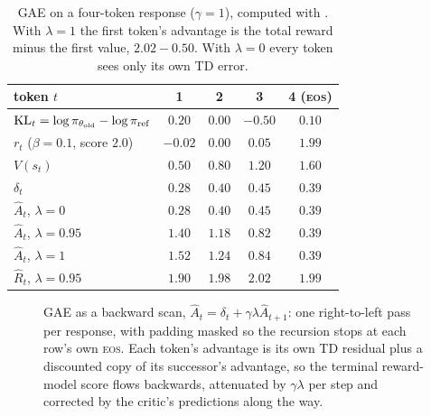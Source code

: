 \begin{table}[ht]
\centering\small
\begin{tabular}{@{}lcccc@{}}
\toprule
token $t$ & 1 & 2 & 3 & 4 (\textsc{eos})\\
\midrule
$\mathrm{KL}_t=\log\pi_{\theta_{\text{old}}}-\log\pi_{\text{ref}}$ & $0.20$ & $0.00$ & $-0.50$ & $0.10$\\
$r_t$ ($\beta=0.1$, score $2.0$) & $-0.02$ & $0.00$ & $0.05$ & $1.99$\\
$V(s_t)$ & $0.50$ & $0.80$ & $1.20$ & $1.60$\\
$\delta_t$ & $0.28$ & $0.40$ & $0.45$ & $0.39$\\
\midrule
$\hat A_t$, $\lambda=0$ & $0.28$ & $0.40$ & $0.45$ & $0.39$\\
$\hat A_t$, $\lambda=0.95$ & $1.40$ & $1.18$ & $0.82$ & $0.39$\\
$\hat A_t$, $\lambda=1$ & $1.52$ & $1.24$ & $0.84$ & $0.39$\\
$\hat R_t$, $\lambda=0.95$ & $1.90$ & $1.98$ & $2.02$ & $1.99$\\
\bottomrule
\end{tabular}
\caption{GAE on a four-token response ($\gamma=1$), computed with . With $\lambda=1$ the
first token's advantage is the total reward minus the first value, $2.02-0.50$. With $\lambda=0$
every token sees only its own TD error.}
\label{tab:rlhf:gae}
\end{table}

\begin{figure}[ht]
\centering
{}
\caption{GAE as a backward scan, $\hat A_t=\delta_t+\gamma\lambda\hat A_{t+1}$: one right-to-left
pass per response, with padding masked so the recursion stops at each row's own \textsc{eos}.
Each token's advantage is its own TD residual plus a discounted copy of its successor's advantage, so the terminal reward-model score flows backwards, attenuated by
$\gamma\lambda$ per step and corrected by the critic's predictions along the way.}
\label{fig:rlhf:gae}
\end{figure}

